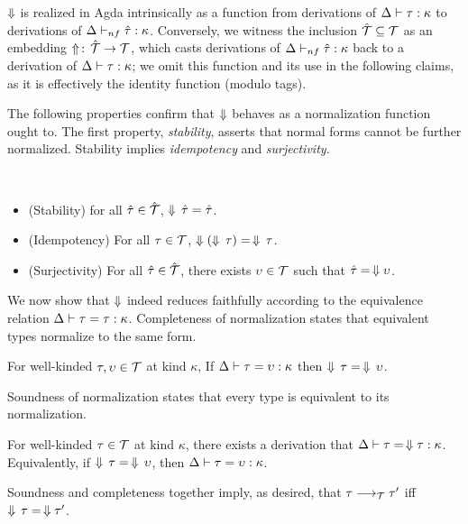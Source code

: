 \documentclass[sigplan,10pt,review]{acmart}\settopmatter{printfolios=true,printccs=false,printacmref=false}
\begin{document}
$\Downarrow$ is realized in Agda intrinsically as a function from derivations of $\Delta \vdash \tau : \kappa$ to derivations of $\Delta \vdash_{nf} \hat{\tau} : \kappa$.  Conversely, we witness the inclusion $\hat{{\mathcal T}} \subseteq {\mathcal T}$ as an embedding $\Uparrow \,:\, \hat{{\mathcal T}} \to {\mathcal T}$, which casts derivations of $\Delta \vdash_{nf} \hat{\tau} : \kappa$  back to a derivation of $\Delta \vdash \tau : \kappa$; we omit this function and its use in the following claims, as it is effectively the identity function (modulo tags).

The following properties confirm that $\Downarrow$ behaves as a normalization function ought to. The first property, \emph{stability}, asserts that normal forms cannot be further normalized. Stability implies \emph{idempotency} and \emph{surjectivity}.

\begin{theorem} ~
  \begin{itemize}
  \item (Stability) for all $\hat{\tau} \in \hat{{\mathcal T}}$, $\Downarrow \, \hat{\tau} = \hat{\tau}$.
  \item (Idempotency) For all $\tau \in {\mathcal T}$, $ \Downarrow (\Downarrow \, \tau) =\, \Downarrow \, \tau$.
  \item (Surjectivity) For all $\hat{\tau} \in \hat{{\mathcal T}}$, there exists $\upsilon \in {\mathcal T}$ such that $\hat{\tau} =\, \Downarrow \upsilon$.
  \end{itemize}
\end{theorem}

We now show that $\Downarrow$ indeed reduces faithfully according to the equivalence relation $\Delta \vdash \tau = \tau : \kappa$. Completeness of normalization states that equivalent types normalize to the same form.

\begin{theorem}[Completeness]
For well-kinded $\tau , \upsilon \in {\mathcal T}$ at kind $\kappa$, If $\Delta \vdash \tau = \upsilon : \kappa$ then $\Downarrow\, \tau = \, \Downarrow \, \upsilon$.
\end{theorem}

\Ni Soundness of normalization states that every type is equivalent to its normalization.

\begin{theorem}[Soundness]
For well-kinded $\tau \in {\mathcal T}$ at kind $\kappa$, there exists a derivation that $\Delta \vdash \tau = \,\Downarrow \tau : \kappa$. Equivalently, if $\Downarrow\, \tau =\, \Downarrow\, \upsilon$, then $\Delta \vdash \tau = \upsilon : \kappa$.
\end{theorem}
\Ni Soundness and completeness together imply, as desired, that $\tau \longrightarrow_{\mathcal T} \tau'$ iff $\Downarrow\, \tau =\, \Downarrow \tau'$.
\end{document}
